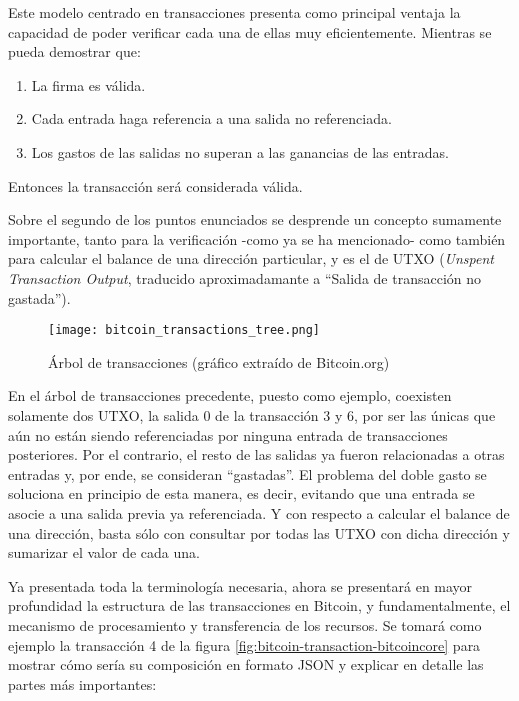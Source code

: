 Este modelo centrado en transacciones presenta como principal ventaja la capacidad de poder verificar cada una de ellas muy eficientemente. Mientras se pueda demostrar que:

\begin{enumerate}
  \item La firma es válida.
  \item Cada entrada haga referencia a una salida no referenciada.
  \item Los gastos de las salidas no superan a las ganancias de las entradas.
\end{enumerate}

Entonces la transacción será considerada válida.

Sobre el segundo de los puntos enunciados se desprende un concepto sumamente importante, tanto para la verificación -como ya se ha mencionado- como también para calcular el balance de una dirección particular, y es el de UTXO (\textit{Unspent Transaction Output}, traducido aproximadamante a ``Salida de transacción no gastada'').

\begin{figure}[H]
  \texttt{[image: bitcoin\_transactions\_tree.png]}
  \centering
  \caption{Árbol de transacciones (gráfico extraído de Bitcoin.org)}
  \label{fig:bitcoin-transactions-tree}
\end{figure}

En el árbol de transacciones precedente, puesto como ejemplo, coexisten solamente dos UTXO, la salida 0 de la transacción 3 y 6, por ser las únicas que aún no están siendo referenciadas por ninguna entrada de transacciones posteriores. Por el contrario, el resto de las salidas ya fueron relacionadas a otras entradas y, por ende, se consideran ``gastadas''. El problema del doble gasto se soluciona en principio de esta manera, es decir, evitando que una entrada se asocie a una salida previa ya referenciada. Y con respecto a calcular el balance de una dirección, basta sólo con consultar por todas las UTXO con dicha dirección y sumarizar el valor de cada una.

Ya presentada toda la terminología necesaria, ahora se presentará en mayor profundidad la estructura de las transacciones en Bitcoin, y fundamentalmente, el mecanismo de procesamiento y transferencia de los recursos. Se tomará como ejemplo la transacción 4 de la figura \ref{fig:bitcoin-transaction-bitcoincore} para mostrar cómo sería su composición en formato JSON y explicar en detalle las partes más importantes:

